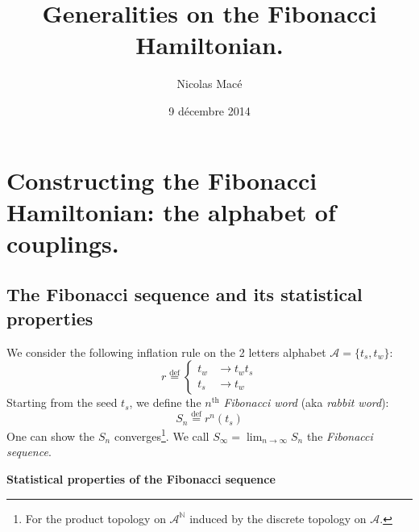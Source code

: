 \documentclass[11pt]{article}
\title{\textbf{Generalities on the Fibonacci Hamiltonian.}}
\author{Nicolas Macé}
\date{9 décembre 2014}
\newcommand{\define}{\ensuremath{ \overset{\text{def}}{=} }}
\numberwithin{equation}{section}
\begin{document}

\maketitle

\section{Constructing the Fibonacci Hamiltonian: the alphabet of couplings.}

\subsection{The Fibonacci sequence and its statistical properties}

We consider the following inflation rule on the 2 letters alphabet $\mathcal{A} = \{t_s, t_w \}$:
\begin{equation}
	r \define \begin{cases}
        t_{w} & \rightarrow t_w t_s \\
        t_s & \rightarrow t_w
      \end{cases}
\end{equation} 
Starting from the seed $t_s$, we define the $n^\text{th}$ \emph{Fibonacci word} (aka \emph{rabbit word}):
\begin{equation}
	S_n \define r^{n}(t_s)
\end{equation}
One can show the $S_n$ converges\footnote{For the product topology on $\mathcal{A}^\mathds{N}$ induced by the discrete topology on $\mathcal{A}$.}. We call $S_\infty = \lim_{n \rightarrow \infty} S_n$ the \emph{Fibonacci sequence}.

\textbf{Statistical properties of the Fibonacci sequence}
\end{document}
